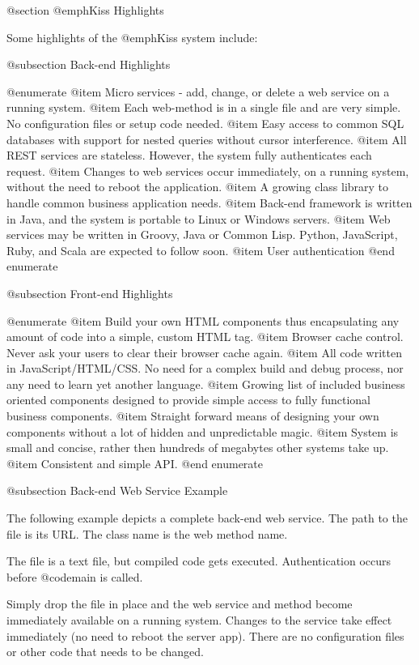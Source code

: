 @section @emph{Kiss} Highlights

Some highlights of the @emph{Kiss} system include:

@subsection Back-end Highlights

@enumerate
@item
Micro services - add, change, or delete a web service on a running system.
@item
Each web-method is in a single file and are very simple.  No configuration files or setup code needed.
@item
Easy access to common SQL databases with support for nested queries without cursor interference.
@item
All REST services are stateless.  However, the system fully authenticates each request.
@item
Changes to web services occur immediately, on a running system, without the need to reboot the application.
@item
A growing class library to handle common business application needs.
@item
Back-end framework is written in Java, and the system is portable to Linux or Windows servers.
@item
Web services may be written in Groovy, Java or Common Lisp.  Python,
JavaScript, Ruby, and Scala are expected to follow soon.
@item
User authentication
@end enumerate

@subsection Front-end Highlights

@enumerate
@item
Build your own HTML components thus encapsulating any amount of code into a simple, custom HTML tag.
@item
Browser cache control.  Never ask your users to clear their browser cache again.
@item
All code written in JavaScript/HTML/CSS.  No need for a complex build and debug process, nor any need to learn yet another language.
@item
Growing list of included business oriented components designed to provide simple access to fully functional business components.
@item
Straight forward means of designing your own components without a lot of hidden and unpredictable magic.
@item
System is small and concise, rather then hundreds of megabytes other systems take up.
@item
Consistent and simple API.
@end enumerate

@subsection Back-end Web Service Example


The following example depicts a complete back-end web service.  The
path to the file is its URL.  The class name is the web method name.

The file is a text file, but compiled code gets executed.
Authentication occurs before @code{main} is called.

Simply drop the file in place and the web service and method become
immediately available on a running system.  Changes to the service
take effect immediately (no need to reboot the server app).  There are
no configuration files or other code that needs to be changed.


